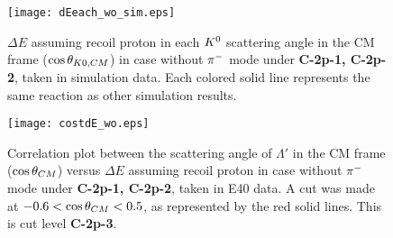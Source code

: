 \begin{figure}[!h]
  \begin{center}
    \texttt{[image: dEeach\_wo\_sim.eps]}
    \caption{$\Delta E$ assuming recoil proton in each $K^{0}$ scattering angle in the CM frame ($\cos{\theta_{K0,CM}}$) in case  without $\pi^{-}$ mode under {\bf C-2p-1, C-2p-2}, taken in simulation data. Each colored solid line represents the same reaction as other simulation results.}
    \label{fig-dEeach_sim}
  \end{center}
\end{figure}

\begin{figure}[!h]
  \begin{center}
    \texttt{[image: costdE\_wo.eps]}
    \caption{Correlation plot between the scattering angle of $\Lambda'$ in the CM frame ($\cos{\theta}_{CM}$) versus $\Delta E$ assuming recoil proton in case  without $\pi^{-}$ mode under {\bf C-2p-1, C-2p-2}, taken in E40 data. A cut was made at $-0.6<\cos{\theta}_{CM}<0.5$, as represented by the red solid lines. This is cut level {\bf C-2p-3}.}
    \label{fig-costdE}
  \end{center}
\end{figure}


